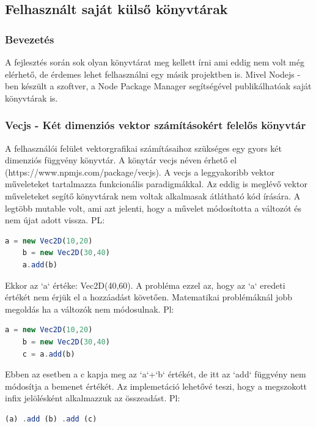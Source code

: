\documentclass[a4paper,12pt,oneside]{report}
\begin{document}
\subsection{Felhasznált saját külső könyvtárak}
\subsubsection{Bevezetés}

\begin{justify}

	A fejlesztés során sok olyan könyvtárat meg kellett írni ami eddig nem volt még elérhető, de érdemes lehet felhasználni egy másik projektben is. Mivel Nodejs -ben készült a szoftver, a Node Package Manager segítségével publikálhatóak saját könyvtárak is.


\end{justify}
\newpage
\subsubsection{Vecjs - Két dimenziós vektor számításokért felelős könyvtár}

\begin{justify}

	A felhasználói felület vektorgrafikai számításaihoz szükséges egy gyors két dimenziós függvény könyvtár. A könytár vecjs néven érhető el (https://www.npmjs.com/package/vecjs). A vecjs a leggyakoribb vektor műveleteket tartalmazza funkcionális paradigmákkal. Az eddig is meglévő vektor műveleteket segítő könyvtárak nem voltak alkalmasak átlátható kód írására. A legtöbb mutable volt, ami azt jelenti, hogy a művelet módosította a változót és nem újat adott vissza. PL:

	\begin{lstlisting}[language=javascript]
	a = new Vec2D(10,20)
	b = new Vec2D(30,40)
	a.add(b)
	\end{lstlisting}

	Ekkor az `a` értéke: Vec2D(40,60). A probléma ezzel az, hogy az `a` eredeti értékét nem érjük el a hozzáadást követően. Matematikai problémáknál jobb megoldás ha a változók nem módosulnak. Pl:

	\begin{lstlisting}[language=javascript]
	a = new Vec2D(10,20)
	b = new Vec2D(30,40)
	c = a.add(b)
	\end{lstlisting}

	Ebben az esetben a c kapja meg az `a`+`b` értékét, de itt az `add` függvény nem módosítja a bemenet értékét. Az implemetáció lehetővé teszi, hogy a megszokott infix jelölésként alkalmazzuk az összeadást. Pl:

	\begin{lstlisting}[language=javascript]
	(a) .add (b) .add (c)
	\end{lstlisting}

\end{justify}
\newpage
\end{document}
